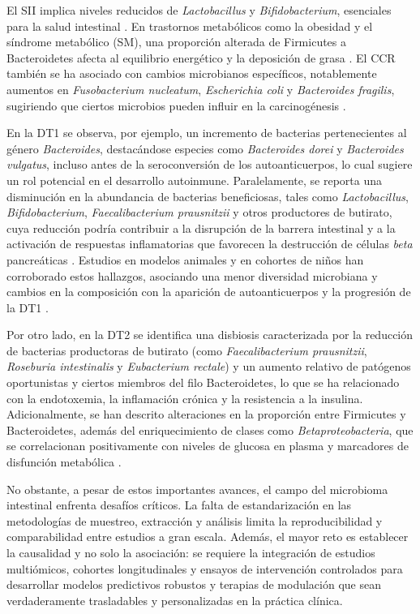 El SII implica niveles reducidos de \textit{Lactobacillus} y \textit{Bifidobacterium}, esenciales para la salud intestinal \cite{carding2015dysbiosis}. En trastornos metabólicos como la obesidad y el síndrome metabólico (SM), una proporción alterada de Firmicutes a Bacteroidetes afecta al equilibrio energético y la deposición de grasa \cite{turnbaugh2006obesity}. El CCR también se ha asociado con cambios microbianos específicos, notablemente aumentos en \textit{Fusobacterium nucleatum}, \textit{Escherichia coli} y \textit{Bacteroides fragilis}, sugiriendo que ciertos microbios pueden influir en la carcinogénesis \cite{castellarin2012fusobacterium}.

En la DT1 se observa, por ejemplo, un incremento de bacterias pertenecientes al género \textit{Bacteroides}, destacándose especies como \textit{Bacteroides dorei} y \textit{Bacteroides vulgatus}, incluso antes de la seroconversión de los autoanticuerpos, lo cual sugiere un rol potencial en el desarrollo autoinmune. Paralelamente, se reporta una disminución en la abundancia de bacterias beneficiosas, tales como \textit{Lactobacillus}, \textit{Bifidobacterium}, \textit{Faecalibacterium prausnitzii} y otros productores de butirato, cuya reducción podría contribuir a la disrupción de la barrera intestinal y a la activación de respuestas inflamatorias que favorecen la destrucción de células \textit{beta} pancreáticas \cite{bielka2022role, mejia2015diet, zheng2018gut}. Estudios en modelos animales y en cohortes de niños han corroborado estos hallazgos, asociando una menor diversidad microbiana y cambios en la composición con la aparición de autoanticuerpos y la progresión de la DT1 \cite{bielka2022role, han2018gut}.

Por otro lado, en la DT2 se identifica una disbiosis caracterizada por la reducción de bacterias productoras de butirato (como \textit{Faecalibacterium prausnitzii}, \textit{Roseburia intestinalis} y \textit{Eubacterium rectale}) y un aumento relativo de patógenos oportunistas y ciertos miembros del filo Bacteroidetes, lo que se ha relacionado con la endotoxemia, la inflamación crónica y la resistencia a la insulina. Adicionalmente, se han descrito alteraciones en la proporción entre Firmicutes y Bacteroidetes, además del enriquecimiento de clases como \textit{Betaproteobacteria}, que se correlacionan positivamente con niveles de glucosa en plasma y marcadores de disfunción metabólica \cite{bielka2022role, huda2021modulating}.

No obstante, a pesar de estos importantes avances, el campo del microbioma intestinal enfrenta desafíos críticos. La falta de estandarización en las metodologías de muestreo, extracción y análisis limita la reproducibilidad y comparabilidad entre estudios a gran escala. Además, el mayor reto es establecer la causalidad y no solo la asociación: se requiere la integración de estudios multiómicos, cohortes longitudinales y ensayos de intervención controlados para desarrollar modelos predictivos robustos y terapias de modulación que sean verdaderamente trasladables y personalizadas en la práctica clínica.


